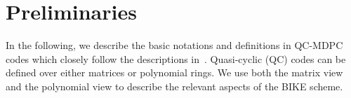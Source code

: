 \documentclass[runningheads]{llncs}
\begin{document}
\section{Preliminaries}
\label{sec::prelim}

In the following, we describe the basic notations and definitions
in QC-MDPC codes which closely follow the descriptions in~\cite{aragon2017bike}. Quasi-cyclic (QC) codes can be  defined  over either matrices or polynomial rings. 
We use both the matrix view and the polynomial view to  
describe the relevant aspects of the BIKE scheme.


\newcommand{\tabincell}[2]{\begin{tabular}{@{}#1@{}}#2\end{tabular}}
\end{document}
